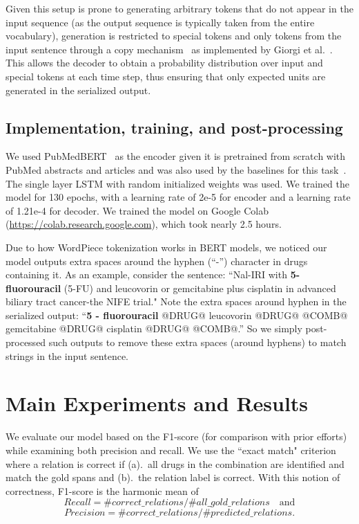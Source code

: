 \documentclass[conference]{IEEEtran}
\begin{document}
Given this setup is prone to generating arbitrary tokens that do not appear in the input sequence (as the output sequence is typically taken from the entire vocabulary), generation is restricted to special tokens and only tokens from the input sentence through a copy mechanism~\cite{zeng-etal-2018-extracting} as  implemented by Giorgi et al.~\cite{giorgi-etal-2022-sequence}. This allows the decoder to obtain a probability distribution over input and special tokens at each time step, thus ensuring that only expected units are generated in the serialized output.


\subsection{Implementation, training, and post-processing}
\label{sec-post}
We used PubMedBERT~\cite{gu2021domain} as the encoder given it is pretrained from scratch with PubMed abstracts and articles and was also used by the baselines for this task~\cite{giorgi-etal-2022-sequence}. The single layer LSTM with random initialized weights was used. We trained the model for 130 epochs, with a learning rate of 2e-5 for encoder and a learning rate of 1.21e-4 for decoder. We trained the model on Google Colab (\url{https://colab.research.google.com}), which took nearly 2.5 hours.

Due to how WordPiece tokenization works in BERT models, we noticed our model outputs extra spaces around the hyphen (``-'') character in drugs containing it. As an example, consider the sentence:  ``Nal-IRI with \textbf{5-fluorouracil} (5-FU) and leucovorin or gemcitabine plus cisplatin
in advanced biliary tract cancer-the NIFE trial."
Note the extra spaces around hyphen in the serialized output: 
``\textbf{5 - fluorouracil} @DRUG@ leucovorin @DRUG@ @COMB@ gemcitabine @DRUG@ 
cisplatin @DRUG@ @COMB@.''
So we simply post-processed such outputs to remove these extra spaces (around hyphens) to match strings in the input sentence. 




\section{Main Experiments and Results}
\label{sec-main-res}
We evaluate our model based on the F1-score (for comparison with prior efforts) while examining both precision and recall. We use the ``exact match" criterion where a relation is correct if (a).~all drugs in the combination are identified and match the gold spans and (b).~the relation label is correct. With this notion of correctness, F1-score is the harmonic mean of 
\begin{equation*}
    Recall = \#correct\_relations/\#all\_gold\_relations \quad \mbox{and}
\end{equation*}
\begin{equation*}
    Precision = \#correct\_relations/\#predicted\_relations.
\end{equation*}
\end{document}

